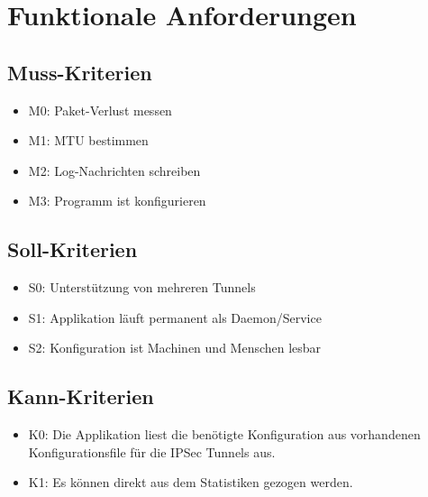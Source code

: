 \section{Funktionale Anforderungen}
\label{sec:Funktionale Anforderungen}


\subsection{Muss-Kriterien}
\begin{itemize}
  \item M0: Paket-Verlust messen
  \item M1: MTU bestimmen
  \item M2: Log-Nachrichten schreiben
  \item M3: Programm ist konfigurieren
\end{itemize}

\subsection{Soll-Kriterien}
\begin{itemize}
  \item S0: Unterstützung von mehreren Tunnels
  \item S1: Applikation läuft permanent als Daemon/Service
  \item S2: Konfiguration ist Machinen und Menschen lesbar
\end{itemize}

\subsection{Kann-Kriterien}
\begin{itemize}
  \item K0: Die Applikation liest die benötigte Konfiguration aus vorhandenen Konfigurationsfile für die \acs{IPSec} Tunnels aus.
  \item K1: Es können direkt aus dem \tool Statistiken gezogen werden.
\end{itemize}